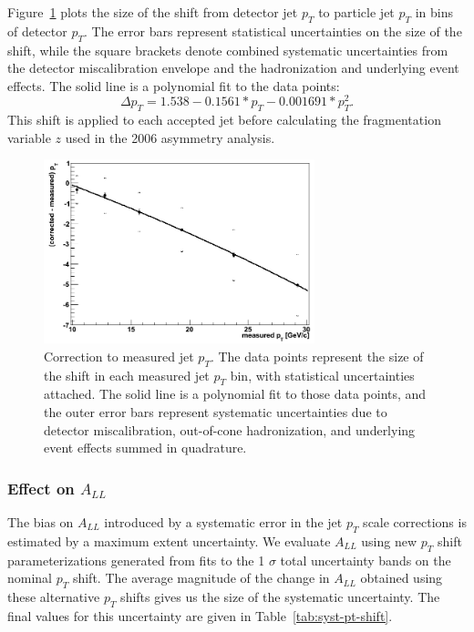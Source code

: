 Figure~\ref{fig:jet-pt-shift} plots the size of the shift from detector jet
\(p_T\) to particle jet \(p_T\) in bins of detector \(p_T\). The error bars
represent statistical uncertainties on the size of the shift, while the square
brackets denote combined systematic uncertainties from the detector
miscalibration envelope and the hadronization and underlying event effects. The
solid line is a polynomial fit to the data points:
%
\begin{equation}
  \Delta p_T = 1.538 - 0.1561*p_T - 0.001691*p_T^2.
\end{equation}
%
This shift is applied to each accepted jet before calculating the fragmentation
variable \(z\) used in the 2006 asymmetry analysis.

\begin{figure}
  \centering
  \includegraphics[width=0.7\textwidth]{figures/jet-pt-shift}
  \caption{Correction to measured jet $p_T$.  The data points represent the size of the shift in each measured jet $p_T$ bin, with statistical uncertainties attached.  The solid line is a polynomial fit to those data points, and the outer error bars represent systematic uncertainties due to detector miscalibration, out-of-cone hadronization, and underlying event effects summed in quadrature.}
  \label{fig:jet-pt-shift}
\end{figure}

\subsubsection{Effect on $A_{LL}$}

The bias on \(A_{LL}\) introduced by a systematic error in the jet \(p_T\) scale
corrections is estimated by a maximum extent uncertainty. We evaluate \(A_{LL}\)
using new \(p_T\) shift parameterizations generated from fits to the 1 $\sigma$
total uncertainty bands on the nominal \(p_T\) shift. The average magnitude of
the change in \(A_{LL}\) obtained using these alternative \(p_T\) shifts gives
us the size of the systematic uncertainty. The final values for this uncertainty
are given in Table~\ref{tab:syst-pt-shift}.

